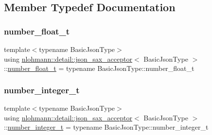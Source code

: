 \subsection{Member Typedef Documentation}
\mbox{\label{classnlohmann_1_1detail_1_1json__sax__acceptor_a5502f483fc60a1bcd73e0e46b6ab36e4}} 
\subsubsection{\texorpdfstring{number\+\_\+float\+\_\+t}{number\_float\_t}}
{\footnotesize\ttfamily template$<$typename Basic\+Json\+Type$>$ \\
using \hyperlink{classnlohmann_1_1detail_1_1json__sax__acceptor}{nlohmann\+::detail\+::json\+\_\+sax\+\_\+acceptor}$<$ Basic\+Json\+Type $>$\+::\hyperlink{classnlohmann_1_1detail_1_1json__sax__acceptor_a5502f483fc60a1bcd73e0e46b6ab36e4}{number\+\_\+float\+\_\+t} =  typename Basic\+Json\+Type\+::number\+\_\+float\+\_\+t}

\mbox{\label{classnlohmann_1_1detail_1_1json__sax__acceptor_a41876b17c0e8bdb55580eaf5e4e2ded8}} 
\subsubsection{\texorpdfstring{number\+\_\+integer\+\_\+t}{number\_integer\_t}}
{\footnotesize\ttfamily template$<$typename Basic\+Json\+Type$>$ \\
using \hyperlink{classnlohmann_1_1detail_1_1json__sax__acceptor}{nlohmann\+::detail\+::json\+\_\+sax\+\_\+acceptor}$<$ Basic\+Json\+Type $>$\+::\hyperlink{classnlohmann_1_1detail_1_1json__sax__acceptor_a41876b17c0e8bdb55580eaf5e4e2ded8}{number\+\_\+integer\+\_\+t} =  typename Basic\+Json\+Type\+::number\+\_\+integer\+\_\+t}

